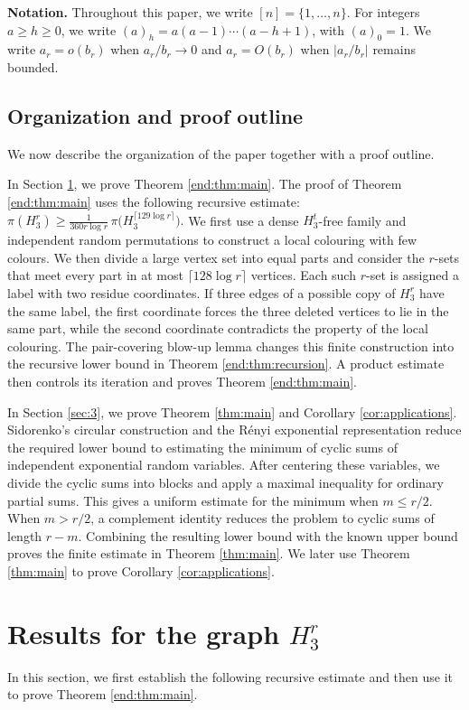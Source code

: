 \documentclass[12pt,a4paper]{article}
\numberwithin{equation}{section}
\theoremstyle{definition}
\theoremstyle{remark}
\begin{document}
\medskip
{\bf\noindent Notation.} Throughout this paper, we write $[n]=\{1,\ldots,n\}$. For integers $a\ge h\ge0$, we write $(a)_h=a(a-1)\cdots(a-h+1)$, with $(a)_0=1$.  
We write $a_r=o(b_r)$ when $a_r/b_r\to0$ and $a_r=O(b_r)$ when $|a_r/b_r|$ remains bounded.


\subsection*{Organization and proof outline}

We now describe the organization of the paper together with a proof outline.

In Section \ref{sec:2}, we prove Theorem \ref{end:thm:main}.  The proof of Theorem \ref{end:thm:main} uses the following recursive estimate: $\pi(H_3^r)\ge \frac{1}{360r\log r}\,\pi\bigl(H_3^{\lceil 129\log r\rceil}\bigr).$
We first use a dense $H_3^t$-free family and independent random permutations to construct a local colouring with few colours.  
We then divide a large vertex set into equal parts and consider the $r$-sets that meet every part in at most $\lceil 128\log r\rceil$ vertices.  
Each such $r$-set is assigned a label with two residue coordinates.  
If three edges of a possible copy of $H_3^r$ have the same label, the first coordinate forces the three deleted vertices to lie in the same part, 
while the second coordinate contradicts the property of the local colouring.  
The pair-covering blow-up lemma changes this finite construction into the recursive lower bound in Theorem \ref{end:thm:recursion}.  
A product estimate then controls its iteration and proves Theorem \ref{end:thm:main}.

In Section \ref{sec:3}, we prove Theorem \ref{thm:main} and Corollary \ref{cor:applications}.  
Sidorenko's circular construction and the R\'enyi exponential representation reduce the required lower bound to estimating the minimum of cyclic sums of independent exponential random variables.  
After centering these variables, we divide the cyclic sums into blocks and apply a maximal inequality for ordinary partial sums.  
This gives a uniform estimate for the minimum when $m\le r/2$.  When $m>r/2$, a complement identity reduces the problem to cyclic sums of length $r-m$.  Combining the resulting lower bound with the known upper bound proves the finite estimate in Theorem \ref{thm:main}. We later use Theorem \ref{thm:main} to prove Corollary \ref{cor:applications}.




\section{Results for the graph \texorpdfstring{$H_3^r$}{H3r}}\label{sec:2}
In this section, we first establish the following recursive estimate and then use it to prove Theorem \ref{end:thm:main}.
\end{document}
